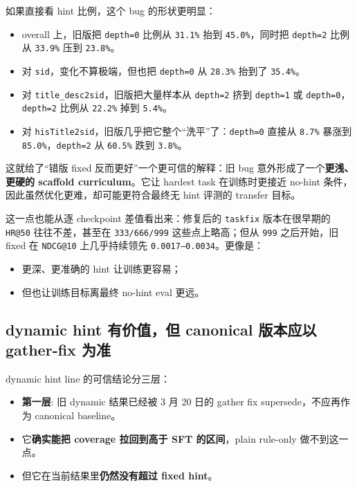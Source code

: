 \documentclass[a4paper]{article}
\begin{document}
如果直接看 hint 比例，这个 bug 的形状更明显：
\begin{itemize}
\item overall 上，旧版把 \texttt{depth=0} 比例从 \texttt{31.1\%} 抬到 \texttt{45.0\%}，同时把 \texttt{depth=2} 比例从 \texttt{33.9\%} 压到 \texttt{23.8\%}。
\item 对 \texttt{sid}，变化不算极端，但也把 \texttt{depth=0} 从 \texttt{28.3\%} 抬到了 \texttt{35.4\%}。
\item 对 \texttt{title\_desc2sid}，旧版把大量样本从 \texttt{depth=2} 挤到 \texttt{depth=1} 或 \texttt{depth=0}，\texttt{depth=2} 比例从 \texttt{22.2\%} 掉到 \texttt{5.4\%}。
\item 对 \texttt{hisTitle2sid}，旧版几乎把它整个“洗平”了：\texttt{depth=0} 直接从 \texttt{8.7\%} 暴涨到 \texttt{85.0\%}，\texttt{depth=2} 从 \texttt{60.5\%} 跌到 \texttt{3.8\%}。
\end{itemize}

这就给了“错版 fixed 反而更好”一个更可信的解释：旧 bug 意外形成了一个\textbf{更浅、更硬的 scaffold curriculum}。它让 hardest task 在训练时更接近 no-hint 条件，因此虽然优化更难，却可能更符合最终无 hint 评测的 transfer 目标。

这一点也能从逐 checkpoint 差值看出来：修复后的 \texttt{taskfix} 版本在很早期的 \texttt{HR@50} 往往不差，甚至在 \texttt{333/666/999} 这些点上略高；但从 \texttt{999} 之后开始，旧 fixed 在 \texttt{NDCG@10} 上几乎持续领先 \texttt{0.0017--0.0034}。更像是：
\begin{itemize}
\item 更深、更准确的 hint 让训练更容易；
\item 但也让训练目标离最终 no-hint eval 更远。
\end{itemize}

\subsection{dynamic hint 有价值，但 canonical 版本应以 gather-fix 为准}

dynamic hint line 的可信结论分三层：
\begin{itemize}
\item \textbf{第一层}: 旧 dynamic 结果已经被 3 月 20 日的 gather fix supersede，不应再作为 canonical baseline。
\item 它\textbf{确实能把 coverage 拉回到高于 SFT 的区间}，plain rule-only 做不到这一点。
\item 但它在当前结果里\textbf{仍然没有超过 fixed hint}。
\end{itemize}
\end{document}
